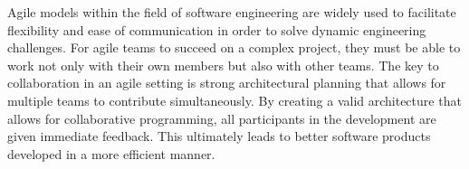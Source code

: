 Agile models within the field of software engineering are widely used to facilitate flexibility and ease of communication in order to solve dynamic engineering challenges.
For agile teams to succeed on a complex project, they must be able to work not only with their own members but also with other teams.
The key to collaboration in an agile setting is strong architectural planning that allows for multiple teams to contribute simultaneously.
By creating a valid architecture that allows for collaborative programming, all participants in the development are given immediate feedback.
This ultimately leads to better software products developed in a more efficient manner.

